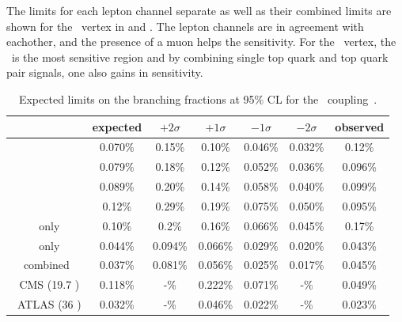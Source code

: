 The limits for each lepton channel separate as well as their combined limits are shown for the \Zct\ vertex in   and . The lepton channels are in agreement with eachother, and the presence of a muon helps the sensitivity. For the \Zct\ vertex, the \TTSR\ is the most sensitive region  and by combining single top quark and top quark pair signals, one also gains in sensitivity. 

\begin{table}[htbp]
	\centering
	\caption{Expected limits on the branching fractions at 95\% CL for the \Zct\ coupling~\cite{Sirunyan:2017kkr,ATLAS-CONF-2017-070}.}
	\begin{tabular}{ccccccc}
		\toprule
		& expected & $+2\sigma$ & $+1\sigma$ & $-1\sigma$ & $-2\sigma$ & observed \\ 
		\midrule
		\mumumu\ & 0.070\% & 0.15\% & 0.10\% & 0.046\% & 0.032\% & 0.12\% \\ 
		
		\emumu\ & 0.079\% & 0.18\% & 0.12\% & 0.052\% & 0.036\% & 0.096\% \\ 
		
		\eemu\ & 0.089\% & 0.20\% & 0.14\% & 0.058\% & 0.040\% & 0.099\% \\ 
		
		\eee\ & 0.12\% & 0.29\% & 0.19\% & 0.075\% & 0.050\% & 0.095\% \B\\ 
		\hdashline
		\STSR\ only & 0.10\% & 0.2\% & 0.16\% & 0.066\% & 0.045\% & 0.17\% \T \\ 
		
		\TTSR\ only & 0.044\% & 0.094\% & 0.066\% & 0.029\% & 0.020\% & 0.043\% \B \\ 
		\hdashline 
		combined & 0.037\% & 0.081\% & 0.056\% & 0.025\% & 0.017\% & 0.045\% \T\B\\ 
		\hdashline
		8 \TeV\ CMS (19.7 \fbinv)    & 0.118\% & -\% &0.222\% & 0.071\% & -\% & 0.049\% \T\B\\
		\hdashline
		13 \TeV\ ATLAS (36 \fbinv)    & 0.032\% & -\% & 0.046\% & 0.022\%& -\% & 0.023\% \T\\
		\hline
	\end{tabular} 
	\label{tab:ResultsTZC}
\end{table}
